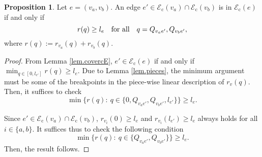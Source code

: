 \documentclass[review]{elsarticle}
\newcommand{\cE}{{\mathcal E}}
\theoremstyle{definition}
\newtheorem{proposition}{Proposition}[section]
\begin{document}
\begin{proposition}\label{prop.chara.cEe}
Let $e=(v_a,v_b)$. An edge $e'\in \cE_{\mathrm{c}}(v_a)\cap \cE_{\mathrm{c}}(v_b)$ is in $\cE_{\mathrm{c}}(e)$ if and only if
$$r(q)\geq l_e\quad \textup{for all}\quad q=Q_{v_ae'}, Q_{v_be'},$$
where $r(q):=r_{v_a}(q)+r_{v_b}(q)$.
\end{proposition}
\begin{proof}
From Lemma \ref{lem.covercE}, $e' \in \cE_{\mathrm{c}}(e)$ if and only if $\min_{q \in [0, l_{e'}]} r(q) \ge l_e$. Due to Lemma \ref{lem.pieces}, the minimum argument must be some of the breakpoints in the piece-wise linear description of $r_v(q)$. Then, it suffices to check
\begin{equation*}
	\min \{r(q):\: q \in \{0, Q_{v_ae'}, Q_{v_be'}, l_{e'}\}\} \ge l_e.
\end{equation*}

Since $e'\in \cE_{\mathrm{c}}(v_a)\cap \cE_{\mathrm{c}}(v_b)$, $r_{v_i}(0)\geq l_e$ and  $r_{v_i}(l_{e'})\geq l_e$  always holds for all $i\in\{a,b\}$.
 It suffices thus to check  the following condition
\begin{equation*}
	\min \{r(q):\: q \in \{ Q_{v_ae'}, Q_{v_be'} \}\}  \ge l_e.
\end{equation*}
Then, the result follows.
\end{proof}
\end{document}
